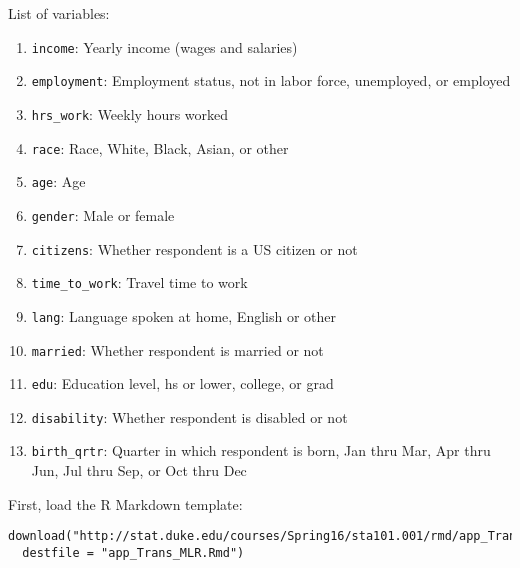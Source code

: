 \documentclass[12pt]{article}
\begin{document}
List of variables:
\begin{enumerate}
\item \texttt{income}: Yearly income (wages and salaries)
\item \texttt{employment}: Employment status, not in labor force, unemployed, or employed
\item \texttt{hrs\_work}: Weekly hours worked
\item \texttt{race}: Race, White, Black, Asian, or other
\item \texttt{age}: Age
\item \texttt{gender}: Male or female
\item \texttt{citizens}: Whether respondent is a US citizen or not
\item \texttt{time\_to\_work}: Travel time to work
\item \texttt{lang}: Language spoken at home, English or other
\item \texttt{married}: Whether respondent is married or not
\item \texttt{edu}: Education level, hs or lower, college, or grad
\item \texttt{disability}: Whether respondent is disabled or not
\item \texttt{birth\_qrtr}: Quarter in which respondent is born, Jan thru Mar, Apr thru Jun, Jul thru Sep, or Oct thru Dec 
\end{enumerate}

First, load the R Markdown template:

{\footnotesize
\begin{Verbatim}[frame=single, formatcom=\color{blue}]
download("http://stat.duke.edu/courses/Spring16/sta101.001/rmd/app_Trans_MLR.Rmd", 
  destfile = "app_Trans_MLR.Rmd")
\end{Verbatim}
}

%
\end{document}
